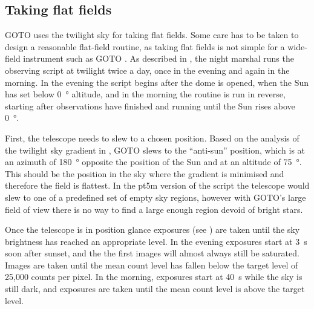 
\subsection{Taking flat fields}
\label{sec:flats}
\begin{colsection}

GOTO uses the twilight sky for taking flat fields. Some care has to be taken to design a reasonable flat-field routine, as taking flat fields is not simple for a wide-field instrument such as GOTO \citep{flats3, flats2}. As described in , the night marshal runs the  observing script at twilight twice a day, once in the evening and again in the morning. In the evening the script begins after the dome is opened, when the Sun has set below \SI{0}{\degree} altitude, and in the morning the routine is run in reverse, starting after observations have finished and running until the Sun rises above \SI{0}{\degree}.

First, the telescope needs to slew to a chosen position. Based on the analysis of the twilight sky gradient in \citet{flats}, GOTO slews to the ``anti-sun'' position, which is at an azimuth of \SI{180}{\degree} opposite the position of the Sun and at an altitude of \SI{75}{\degree}. This should be the position in the sky where the gradient is minimised and therefore the field is flattest. In the pt5m version of the script the telescope would slew to one of a predefined set of empty sky regions, however with GOTO's large field of view there is no way to find a large enough region devoid of bright stars.

Once the telescope is in position glance exposures (see ) are taken until the sky brightness has reached an appropriate level. In the evening exposures start at \SI{3}{\second} soon after sunset, and the the first images will almost always still be saturated. Images are taken until the mean count level has fallen below the target level of 25,000 counts per pixel. In the morning, exposures start at \SI{40}{\second} while the sky is still dark, and exposures are taken until the mean count level is above the target level.


\end{colsection}
